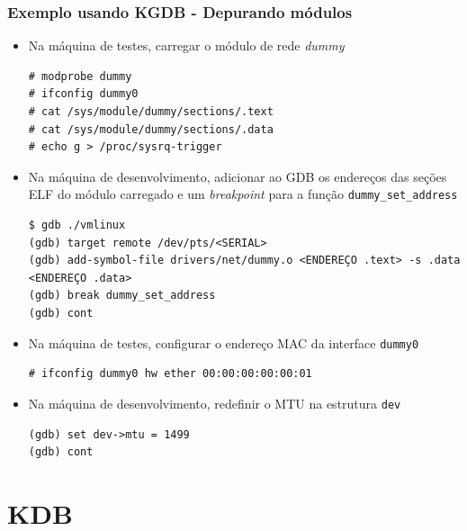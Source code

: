 \documentclass[xcolor=pdftex,dvipsnames,table]{beamer}
\begin{document}
\begin{frame}[fragile]
       \frametitle{Exemplo usando KGDB - Depurando módulos}
        \begin{center}
	\begin{itemize}
		\item Na máquina de testes, carregar o módulo de rede \textit{dummy}
		\tiny
		\begin{verbatim}
# modprobe dummy
# ifconfig dummy0
# cat /sys/module/dummy/sections/.text
# cat /sys/module/dummy/sections/.data
# echo g > /proc/sysrq-trigger
		\end{verbatim}
		\normalsize
		\item Na máquina de desenvolvimento, adicionar ao GDB os endereços das seções ELF do módulo carregado e um \textit{breakpoint} para a função {\tt dummy\_set\_address}
		\tiny
		\begin{verbatim}
$ gdb ./vmlinux
(gdb) target remote /dev/pts/<SERIAL>
(gdb) add-symbol-file drivers/net/dummy.o <ENDEREÇO .text> -s .data <ENDEREÇO .data>
(gdb) break dummy_set_address
(gdb) cont
		\end{verbatim}
		\normalsize
		\item Na máquina de testes, configurar o endereço MAC da interface {\tt dummy0}
		\tiny
		\begin{verbatim}
# ifconfig dummy0 hw ether 00:00:00:00:00:01
		\end{verbatim}
		\normalsize
		\item Na máquina de desenvolvimento, redefinir o MTU na estrutura {\tt dev}
		\tiny
		\begin{verbatim}
(gdb) set dev->mtu = 1499
(gdb) cont
		\end{verbatim}
		\normalsize
	\end{itemize}
        \end{center}
\end{frame}

\section{KDB}
\end{document}
